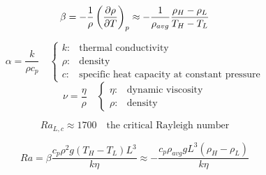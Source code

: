 \begin{equation}
    \beta = -\frac{1}{\rho} \left( \pdv{\rho}{T} \right)_p \approx -\frac{1}{\rho_{avg}} \frac{\rho_H - \rho_L}{T_H - T_L}
    \label{thermal_expansion}
\end{equation}

\begin{equation}
    \alpha = \frac{k}{\rho c_p} \quad
    \begin{cases}
        k :& \text{thermal conductivity}\\
        \rho :& \text{density}\\
        c:& \text{specific heat capacity at constant pressure}
    \end{cases}
    \label{thermal_diffusivity}
\end{equation}
\begin{equation}
    \nu = \frac{\eta}{\rho} \quad
    \begin{cases}
        \eta:& \text{dynamic viscosity}\\
        \rho:& \text{density}
    \end{cases}
    \label{kinematic_viscosity}
\end{equation}

\begin{equation}
    Ra_{L,c} \approx 1700 \quad \text{the critical Rayleigh number}
    \label{rayleigh_number_critic}
\end{equation}

\begin{equation}
    Ra = \beta \frac{c_p\rho^2 g (T_H-T_L) L^3}{k\eta} \approx - \frac{c_p \rho_{avg} g L^3(\rho_H-\rho_L)}{k\eta}
    \label{rayleigh_number_final}
\end{equation}
